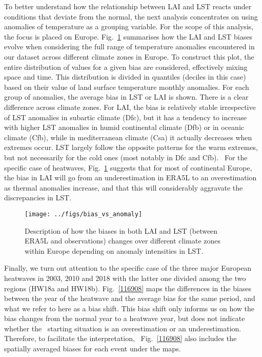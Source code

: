 \documentclass[gmd, manuscript]{copernicus}
\begin{document}
{To better understand how the relationship between LAI and LST reacts
under conditions that deviate from the normal, the next analysis
concentrates on using anomalies of temperature as a grouping variable.
For the scope of this analysis, the focus is placed on Europe.
Fig.~{\ref{560364}} summarises how the LAI and LST
biases evolve when considering the full range of temperature anomalies
encountered in our dataset across different climate zones in Europe. {To
construct this plot}, the entire distribution of values for a given bias
are considered, effectively mixing space and time. This distribution is
divided in quantiles (deciles in this case) based on their value of land
surface temperature monthly anomalies. For each group of anomalies, the
average bias in LST or LAI is shown. There is a clear difference across
climate zones. For LAI, the bias is relatively stable irrespective of
LST anomalies in subartic climate (Dfc), but it has a tendency to
increase with higher LST anomalies in humid continental climate (Dfb) or
in oceanic climate (Cfb), while in mediterranean climate (Csa) it
actually decreases when extremes occur. LST largely follow the opposite
patterns for the warm extremes, but not necessarily for the cold ones
(most notably in Dfc and Cfb).~ For the specific case of heatwaves,
Fig.~{\ref{560364}} suggests that for most of
continental Europe, the bias in LAI will go from an underestimation in
ERA5L to an overestimation as thermal anomalies increase, and that this
will considerably aggravate the discrepancies in LST.

\begin{figure}[H]
\begin{center}
\texttt{[image: ../figs/bias\_vs\_anomaly]}
\caption{{Description of how the biases in both LAI and LST (between ERA5L and
observations) changes over different climate zones within Europe
depending on anomaly intensities in LST.
{\label{560364}}%
}}
\end{center}
\end{figure}

Finally, we turn out attention to the specific case of the three major
European heatwaves in 2003, 2010 and 2018 with the latter one divided
among the two regions (HW18a and HW18b).
Fig.~{\ref{116908}} maps the differences in the biases
between the year of the heatwave and the average bias for the same
period, and what we refer to here as a bias shift. This bias shift only
informs us on how the bias changes from the normal year to a heatwave
year, but does not indicate whether the~ starting situation is an
overestimation or an underestimation. Therefore, to facilitate the
interpretation,~ Fig.~{\ref{116908}} also includes the
spatially averaged biases for each event under the maps.~

}
\end{document}
